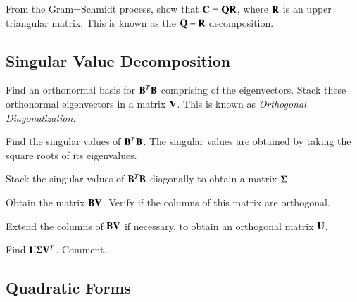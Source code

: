 \begin{problem}
	From the Gram=Schmidt process, show that $\mathbf{C}=\mathbf{Q}\mathbf{R}$, where $\mathbf{R}$ is an upper triangular matrix.  This is known as the $\mathbf{Q}-\mathbf{R}$ decomposition.  
\end{problem}


\subsection{Singular Value Decomposition}

\begin{problem}
	Find an orthonormal basis for $\mathbf{B}^T\mathbf{B}$ comprising of the eigenvectors.  Stack these orthonormal eigenvectors in a matrix $\mathbf{V}$. This is known as {\em Orthogonal Diagonalization}.  
\end{problem}
\begin{problem}
	Find the singular values of $\mathbf{B}^T\mathbf{B}$.  The singular values are obtained by taking the square roots of its eigenvalues.  
\end{problem}
\begin{problem}
	Stack the singular values of $\mathbf{B}^T\mathbf{B}$ diagonally to obtain a matrix $\mathbf{\Sigma}$.
\end{problem}

\begin{problem}
	Obtain the matrix $\mathbf{B}\mathbf{V}$.  Verify if the columns of this matrix are orthogonal.
\end{problem}

\begin{problem}
	Extend the columns of $\mathbf{B}\mathbf{V}$ if necessary, to obtain an orthogonal matrix $\mathbf{U}$.
\end{problem}

\begin{problem}
	Find $\mathbf{U}\mathbf{\Sigma}\mathbf{V}^T$.  Comment.
\end{problem}

\subsection{Quadratic Forms}

